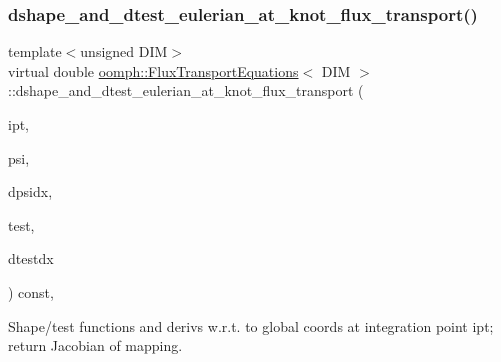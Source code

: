 \mbox{\label{classoomph_1_1FluxTransportEquations_a21e7b05ac839ce2db818356ee6906e1c}} 
\subsubsection{\texorpdfstring{dshape\+\_\+and\+\_\+dtest\+\_\+eulerian\+\_\+at\+\_\+knot\+\_\+flux\+\_\+transport()}{dshape\_and\_dtest\_eulerian\_at\_knot\_flux\_transport()}}
{\footnotesize\ttfamily template$<$unsigned D\+IM$>$ \\
virtual double \hyperlink{classoomph_1_1FluxTransportEquations}{oomph\+::\+Flux\+Transport\+Equations}$<$ D\+IM $>$\+::dshape\+\_\+and\+\_\+dtest\+\_\+eulerian\+\_\+at\+\_\+knot\+\_\+flux\+\_\+transport (\begin{DoxyParamCaption}\item[{const unsigned \&}]{ipt,  }\item[{\hyperlink{classoomph_1_1Shape}{Shape} \&}]{psi,  }\item[{\hyperlink{classoomph_1_1DShape}{D\+Shape} \&}]{dpsidx,  }\item[{\hyperlink{classoomph_1_1Shape}{Shape} \&}]{test,  }\item[{\hyperlink{classoomph_1_1DShape}{D\+Shape} \&}]{dtestdx }\end{DoxyParamCaption}) const\hspace{0.3cm}{\ttfamily [protected]}, {}}



Shape/test functions and derivs w.\+r.\+t. to global coords at integration point ipt; return Jacobian of mapping. 



